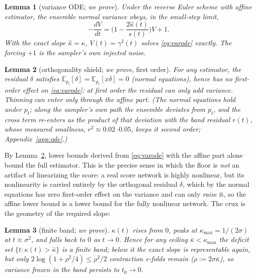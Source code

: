 \documentclass[11pt]{article}
\newtheorem{lemma}{Lemma}
\theoremstyle{remark}
\newcommand{\kb}{\bar\kappa}
\newcommand{\E}{\mathbb{E}}
\newcommand{\sigsq}{\sigma^2}
\begin{document}
\begin{lemma}[variance ODE; \emph{we prove}]\label{lem:ode}
Under the reverse Euler scheme with affine estimator, the ensemble normal variance obeys,
in the small-step limit,
\begin{equation}
-\frac{dV}{dt}=\Big(1-\frac{2\hat\kappa(t)}{s(t)}\Big)V+1 .
\label{eq:varode}
\end{equation}
With the exact slope $\hat\kappa=\kappa$, $V(t)=\gamma^2(t)$ solves \eqref{eq:varode}
exactly. The forcing $+1$ is the sampler's own injected noise.
\end{lemma}

\begin{lemma}[orthogonality shield; \emph{we prove}, first order]\label{lem:shield}
For any estimator, the residual $\delta$ satisfies $\E_{p_t}[\delta]=\E_{p_t}[x\delta]=0$
(normal equations), hence has no first-order effect on \eqref{eq:varode}: at first order
the residual can only \emph{add} variance. Thinning can enter only through the affine
part. (The normal equations hold under $p_t$; along the sampler's own path the ensemble
deviates from $p_t$, and the cross term re-enters as the product of that deviation with
the band residual $r(t)$, whose measured smallness, $r^2\approx0.02$--$0.05$, keeps it
second order; Appendix~\ref{app:ode}.)
\end{lemma}

By Lemma~\ref{lem:shield}, lower bounds derived from \eqref{eq:varode} with the affine
part alone bound the full estimator. This is the precise sense in which the floor is
\emph{not} an artifact of linearizing the score: a real score network is highly nonlinear,
but its nonlinearity is carried entirely by the orthogonal residual $\delta$, which by the
normal equations has zero first-order effect on the variance and can only \emph{raise} it,
so the affine lower bound is a lower bound for the fully nonlinear network. The crux is the
geometry of the required slope:

\begin{lemma}[finite band; \emph{we prove}]\label{lem:band}
$\kappa(t)$ rises from $0$, peaks at $\kappa_{\max}=1/(2\sigma)$ at $t\approx\sigsq$,
and falls back to $0$ as $t\to0$. Hence for any ceiling $\kb<\kappa_{\max}$ the deficit
set $\{t:\kappa(t)>\kb\}$ is a finite band; below it the exact slope is representable
again, but only $2\log(1+\rho^2/4)\le\rho^2/2$ contraction e-folds remain
($\rho:=2\sigma\kb$), so variance frozen in the band persists to $t_0\to0$.
\end{lemma}
\end{document}
